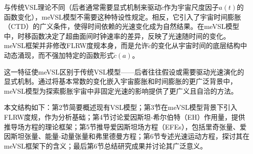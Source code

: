 \documentclass[jkps,preprint,fleqn]{revtex4}
\newcommand{\tc}{\tilde{c}}
\begin{document}
与传统VSL理论不同（后者通常需要显式机制来驱动$\tc$作为宇宙尺度因子$a(t)$的函数变化），meVSL模型不需要这种特设性规定。相反，它引入了宇宙时间膨胀（CTD）的广义条件，使得时间依赖的光速变化成为自然结果。在meVSL模型中，时移函数决定了超曲面间时钟速率的差异，反映了光速随时间的变化\cite{Lee:2024zcu}。meVSL框架并非修改FLRW度规本身，而是允许$\tc$的变化从宇宙时间的底层结构中动态涌现，而不强加特定的函数形式$\tc(a)$。

这一特征使meVSL区别于传统VSL模型——后者往往假设或需要驱动光速演化的显式机制\cite{Avelino:1999is,Belinchon:1999kq,Avelino:2000ph,Szydlowski:2002kz,Magueijo:2003gj,Shojaie:2004sq,Shojaie:2004xw,Balcerzak:2013kha,Balcerzak:2014rga,Franzmann:2017nsc,Hanimeli:2019wrt,Skara:2019usd,Bhattacharjee:2020fgl,Gupta:2020anq,Cuzinatto:2022mfe,Cuzinatto:2022vvy,Cuzinatto:2022dta,Bileska:2024odt,Coleman:1997xq,Albrecht:1998ir,Barrow:1998df,Barrow:1999is,Bassett:2000wj,Jacobson:2000xp,Magueijo:2000zt,Clayton:1998hv,Drummond:1999ut,Clayton:1999zs,Liberati:2000us,Clayton:2000xt,Drummond:2001rj,Amelino-Camelia:1996bln,Amelino-Camelia:1997ieq,Ellis:1999sd,Amelino-Camelia:2000bxx,Amelino-Camelia:2000cpa,Ellis:2000sf,Kowalski-Glikman:2001vvk,Bruno:2001mw,Magueijo:2001cr,Amelino-Camelia:2002uql,Magueijo:2002pg,Moffat:1992ud,Manida:1999rx,Barrow:1999st,Stepanov:1999ax,Magueijo:2000au,Moffat:2002nm,Kaelbermann:1998hu,Randall:1999ee,Randall:1999vf,Kiritsis:1999tx,Chung:1999xg,Alexander:1999cb,Ishihara:2000nf,Csaki:2000dm,Youm:2001sw,Youm:2001zk,Grojean:2001pv,Youm:2001zp,Drummond:1979pp,Novello:1988ma,Barton:1989dq,Scharnhorst:1990sr,Shore:1995fz,Colladay:1995qb,Coleman:1998ti,Bertolami:1999da,Shore:2000bs,Greenberg:2002uu,Teyssandier:2003qh,Shore:2003zc,Blasone:2003wf,Alexander:2001dr,Burgess:2002tb}。通过将基本常数的变化嵌入宇宙膨胀和时间膨胀的更广泛背景中，meVSL模型为探索膨胀宇宙中非固定光速的影响提供了更广义且自洽的方法。

本文结构如下：第2节简要概述现有VSL模型；第3节在meVSL模型背景下引入FLRW度规，作为分析基础；第4节讨论爱因斯坦-希尔伯特（EH）作用量，提供推导场方程的理论框架；第5节推导爱因斯坦场方程（EFEs），包括里奇张量、爱因斯坦张量、能量-动量张量和弗里德曼方程；第6节专述光速运动方程，探讨其在meVSL框架下的含义；最后第6节总结研究成果并讨论其广泛意义。
\end{document}
